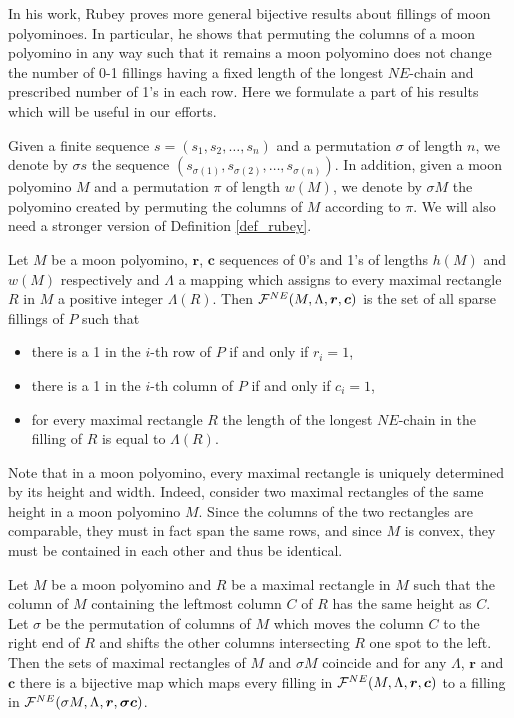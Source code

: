 In his work, Rubey \cite{Rubey11} proves more general bijective results about fillings of moon polyominoes. In particular,
he shows that permuting the columns of a moon polyomino in any way such that it remains a moon polyomino does not change
the number of 0-1 fillings having a fixed length of the longest $NE$-chain and prescribed number of 1's in each row.
Here we formulate a part of his results which will be useful in our efforts. 

Given a finite sequence $s = (s_1, s_2, \ldots, s_n)$ and a permutation $\sigma$ of length $n$,
we denote by $\sigma s$ the sequence $(s_{\sigma(1)}, s_{\sigma(2)}, \ldots, s_{\sigma(n)})$. In addition,
given a moon polyomino $M$ and a permutation $\pi$ of length $w(M)$, we denote by $\sigma M$ the polyomino created by
permuting the columns of $M$ according to $\pi$. We will also need a stronger version of Definition \ref{def_rubey}.

\begin{defn}\label{def_strong_rubey}
Let $M$ be a moon polyomino, $\bm{r}$, $\bm{c}$ sequences of 0's and 1's of lengths $h(M)$ and $w(M)$ respectively
and $\Lambda$ a mapping which assigns to every maximal rectangle $R$ in $M$ a positive integer $\Lambda(R)$.
Then $\mathcal{F}^{NE}(M, \Lambda, \bm{r}, \bm{c})$ is the set of all sparse fillings of $P$ such that
\begin{itemize}
\item there is a 1 in the $i$-th row of $P$ if and only if $r_i = 1$,
\item there is a 1 in the $i$-th column of $P$ if and only if $c_i = 1$,
\item for every maximal rectangle $R$ the length of the longest $NE$-chain in the filling of $R$ is equal to $\Lambda(R)$.
\end{itemize}
\end{defn}

Note that in a moon polyomino, every maximal rectangle is uniquely determined by its height and width. 
Indeed, consider two maximal rectangles of the same height in a moon polyomino $M$. Since the columns of the two rectangles
are comparable, they must in fact span the same rows, and since $M$ is convex, they must be contained in each other and thus
be identical.

\begin{thm}\label{thm_rubey}
Let $M$ be a moon polyomino and $R$ be a maximal rectangle in $M$ such that the column of $M$ containing 
the leftmost column $C$ of $R$ has the same height as $C$. Let $\sigma$ be the permutation of columns of $M$
which moves the column $C$ to the right end of $R$ and shifts the other columns intersecting $R$ one spot to the left.
Then the sets of maximal rectangles of $M$ and $\sigma M$ coincide and 
for any $\Lambda$, $\bm{r}$ and $\bm{c}$ there is a bijective map which maps every filling in $\mathcal{F}^{NE}(M, \Lambda, \bm{r}, \bm{c})$ to a 
filling in $\mathcal{F}^{NE}(\sigma M, \Lambda, \bm{r}, \bm{\sigma c})$.
\end{thm}

